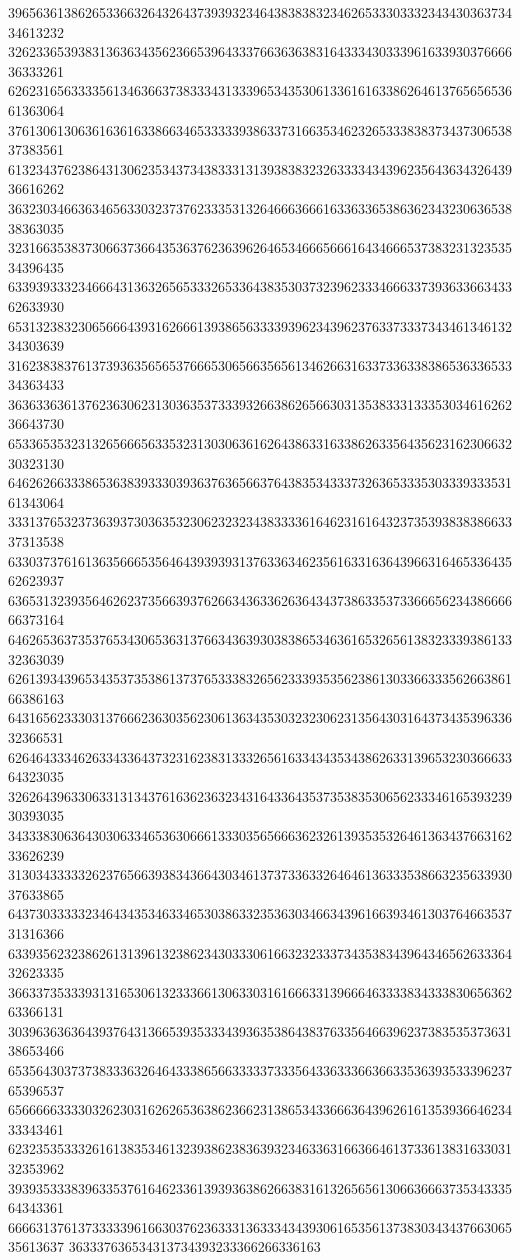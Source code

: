39656361386265336632643264373939323464383838323462653330333234343036373434613232
32623365393831363634356236653964333766363638316433343033396163393037666636333261
62623165633335613463663738333431333965343530613361616338626461376565653661363064
37613061306361636163386634653333393863373166353462326533383837343730653837383561
61323437623864313062353437343833313139383832326333343439623564363432643936616262
36323034663634656330323737623335313264666366616336336538636234323063653838363035
32316635383730663736643536376236396264653466656661643466653738323132353534396435
63393933323466643136326565333265336438353037323962333466633739363366343362633930
65313238323065666439316266613938656333393962343962376337333734346134613234303639
31623838376137393635656537666530656635656134626631633733633838653633653334363433
36363363613762363062313036353733393266386265663031353833313335303461626236643730
65336535323132656665633532313030636162643863316338626335643562316230663230323130
64626266333865363839333039363763656637643835343337326365333530333933353161343064
33313765323736393730363532306232323438333361646231616432373539383838663337313538
63303737616136356665356464393939313763363462356163316364396631646533643562623937
63653132393564626237356639376266343633626364343738633537336665623438666666373164
64626536373537653430653631376634363930383865346361653265613832333938613332363039
62613934396534353735386137376533383265623339353562386130336633356266386166386163
64316562333031376662363035623061363435303232306231356430316437343539633632366531
62646433346263343364373231623831333265616334343534386263313965323036663364323035
32626439633063313134376163623632343164336435373538353065623334616539323930393035
34333830636430306334653630666133303565666362326139353532646136343766316233626239
31303433333262376566393834366430346137373363326464613633353866323563393037633865
64373033333234643435346334653038633235363034663439616639346130376466353731316366
63393562323862613139613238623430333061663232333734353834396434656263336432623335
36633735333931316530613233366130633031616663313966646333383433383065636263366131
30396363636439376431366539353334393635386438376335646639623738353537363138653466
65356430373738333632646433386566333337333564336333663663353639353339623765396537
65666663333032623031626265363862366231386534336663643962616135393664623433343461
62323535333261613835346132393862383639323463363166366461373361383163303132353962
39393533383963353761646233613939363862663831613265656130663666373534333564343361
66663137613733333961663037623633313633343439306165356137383034343766306535613637
363337636534313734393233366266336163
